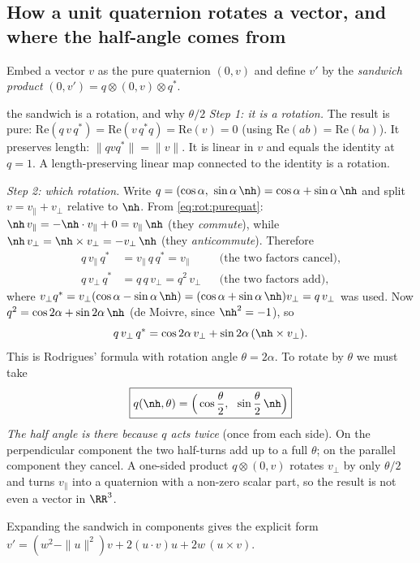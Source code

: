 \subsection{How a unit quaternion rotates a vector, and where the half-angle comes from}\label{sec:rot:unit-quaternion-rotates}
Embed a vector $v$ as the pure quaternion $(0,v)$ and define $v'$ by the \emph{sandwich product} $(0,v')=q\otimes(0,v)\otimes q^*$.

\begin{deriv}{the sandwich is a rotation, and why $\theta/2$}
\emph{Step 1: it is a rotation.} The result is pure: $\mathrm{Re}(q\,v\,q^*)=\mathrm{Re}(v\,q^*q)=\mathrm{Re}(v)=0$ (using $\mathrm{Re}(ab)=\mathrm{Re}(ba)$). It preserves length: $\|qvq^*\|=\|v\|$. It is linear in $v$ and equals the identity at $q=1$. A length-preserving linear map connected to the identity is a rotation.

\emph{Step 2: which rotation.} Write $q=(\cos\alpha,\ \sin\alpha\,\nh)=\cos\alpha+\sin\alpha\,\nh$ and split $v=v_\parallel+v_\perp$ relative to $\nh$. From \eqref{eq:rot:purequat}: $\nh\,v_\parallel=-\nh\cdot v_\parallel+0=v_\parallel\,\nh$ (they \emph{commute}), while $\nh\,v_\perp=\nh\times v_\perp=-v_\perp\,\nh$ (they \emph{anticommute}). Therefore
\begin{align*}
q\,v_\parallel\,q^*&=v_\parallel\,q\,q^*=v_\parallel &&\text{(the two factors cancel)},\\
q\,v_\perp\,q^*&=q\,q\,v_\perp=q^2\,v_\perp &&\text{(the two factors add)},
\end{align*}
where $v_\perp q^*=v_\perp(\cos\alpha-\sin\alpha\,\nh)=(\cos\alpha+\sin\alpha\,\nh)v_\perp=q\,v_\perp$ was used. Now $q^2=\cos2\alpha+\sin2\alpha\,\nh$ (de Moivre, since $\nh^2=-1$), so
\[
q\,v_\perp\,q^*=\cos2\alpha\,v_\perp+\sin2\alpha\,(\nh\times v_\perp).
\]
This is Rodrigues' formula with rotation angle $\theta=2\alpha$. To rotate by $\theta$ we must take
\[
\boxed{q(\nh,\theta)=\Big(\cos\frac\theta2,\ \ \sin\frac\theta2\,\nh\Big)}
\]
\emph{The half angle is there because $q$ acts twice} (once from each side). On the perpendicular component the two half-turns add up to a full $\theta$; on the parallel component they cancel. A one-sided product $q\otimes(0,v)$ rotates $v_\perp$ by only $\theta/2$ and turns $v_\parallel$ into a quaternion with a non-zero scalar part, so the result is not even a vector in $\RR^3$.
\end{deriv}
Expanding the sandwich in components gives the explicit form $v'=(w^2-\|u\|^2)v+2(u\cdot v)u+2w\,(u\times v)$.

